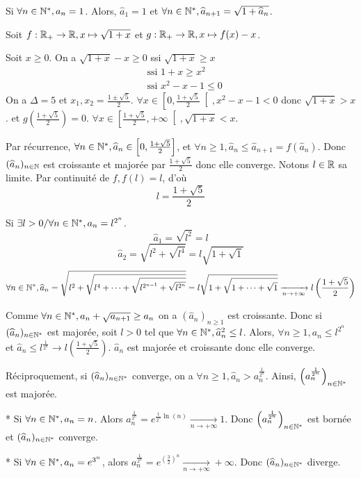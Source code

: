 \begin{solution}
Si $\forall n \in \mathbb N^*, a_n = 1$. Alors, $\widehat{a}_1 = 1$ et $\forall n \in \mathbb N^*, \widehat{a}_{n+1} = \sqrt{1 + \widehat{a}_n}$.

Soit $f : \mathbb R_+ \to \mathbb R, x \mapsto \sqrt{1+x}$ et $g : \mathbb R_+ \to \mathbb R, x \mapsto f(x) - x$.

Soit $x \geq 0$. On a $\sqrt{1+x} - x \geq 0$ ssi $\sqrt{1+x} \geq x$
\[
\begin{aligned}
&\text{ssi } 1+x \geq x^2 \\
&\text{ssi } x^2 - x - 1 \leq 0
\end{aligned}
\]
On a $\Delta = 5$ et $x_1, x_2 = \frac{1 \pm \sqrt{5}}{2}$.
$\forall x \in \left[0, \frac{1+\sqrt{5}}{2}\right[, x^2 - x - 1 < 0$ donc $\sqrt{1+x} > x$.
et $g\left( \frac{1+\sqrt{5}}{2} \right) = 0$.
$\forall x \in \left[ \frac{1+\sqrt{5}}{2}, +\infty \right[, \sqrt{1+x} < x$.

Par récurrence, $\forall n \in \mathbb N^*, \widehat{a}_n \in \left[0, \frac{1+\sqrt{5}}{2}\right]$, et $\forall n \geq 1, \widehat{a}_n \leq \widehat{a}_{n+1} = f(\widehat{a}_n)$. Donc $(\widehat{a}_n)_{n \in \mathbb N}$ est croissante et majorée par $\frac{1+\sqrt{5}}{2}$ donc elle converge.
Notons $l \in \mathbb R$ sa limite. Par continuité de $f, f(l) = l$, d'où
\[
l = \frac{1+\sqrt{5}}{2}
\]

Si $\exists l > 0 / \forall n \in \mathbb N^*, a_n = l^{2^n}$.
\[
\widehat{a}_1 = \sqrt{l^2} = l
\]
\[
\widehat{a}_2 = \sqrt{l^2 + \sqrt{l^4}} = l \sqrt{1 + \sqrt{1}}
\]
\[
\forall n \in \mathbb N^*, \widehat{a}_n = \sqrt{l^2 + \sqrt{l^4 + \dots + \sqrt{l^{2^{n-1}} + \sqrt{l^{2^n}}}}} = l \sqrt{1 + \sqrt{1 + \dots + \sqrt{1}}} \xrightarrow[n \to +\infty]{} l \left( \frac{1+\sqrt{5}}{2} \right)
\]

Comme $\forall n \in \mathbb N^*, a_n + \sqrt{a_{n+1}} \geq a_n$ on a $(\widehat{a}_n)_{n \geq 1}$ est croissante. Donc si $(\widehat{a}_n)_{n \in \mathbb N^*}$ est majorée, soit $l > 0$ tel que $\forall n \in \mathbb N^*, \widehat{a}_n^2 \leq l$.
Alors, $\forall n \geq 1, a_n \leq l^{2^n}$ et $\widehat{a}_n \leq l^{\frac{1}{2^n}} \to l \left( \frac{1+\sqrt{5}}{2} \right)$.
$\widehat{a}_n$ est majorée et croissante donc elle converge.

Réciproquement, si $(\widehat{a}_n)_{n \in \mathbb N^*}$ converge, on a $\forall n \geq 1, \widehat{a}_n > a_n^{\frac{1}{2^n}}$. Ainsi, $\left( a_n^{\frac{1}{2^n}} \right)_{n \in \mathbb N^*}$ est majorée.

* Si $\forall n \in \mathbb N^*, a_n = n$. Alors $a_n^{\frac{1}{2^n}} = e^{\frac{1}{2^n} \ln(n)} \xrightarrow[n \to +\infty]{} 1$.
Donc $\left( a_n^{\frac{1}{2^n}} \right)_{n \in \mathbb N^*}$ est bornée et $(\widehat{a}_n)_{n \in \mathbb N^*}$ converge.

* Si $\forall n \in \mathbb N^*, a_n = e^{3^n}$, alors $a_n^{\frac{1}{2^n}} = e^{\left(\frac{3}{2}\right)^n} \xrightarrow[n \to +\infty]{} +\infty$.
Donc $(\widehat{a}_n)_{n \in \mathbb N^*}$ diverge.
\end{solution}

